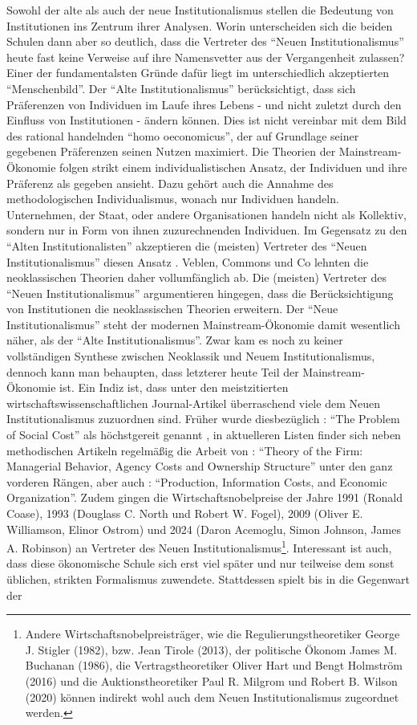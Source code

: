 Sowohl der alte als auch der neue Institutionalismus stellen die Bedeutung von Institutionen ins Zentrum ihrer Analysen. Worin unterscheiden sich die beiden Schulen dann aber so deutlich, dass die Vertreter des "`Neuen Institutionalismus"' heute fast keine Verweise auf ihre Namensvetter aus der Vergangenheit zulassen? Einer der fundamentalsten Gründe dafür liegt im unterschiedlich akzeptierten "`Menschenbild"'. Der "`Alte Institutionalismus"' berücksichtigt, dass sich Präferenzen von Individuen im Laufe ihres Lebens - und nicht zuletzt durch den Einfluss von Institutionen - ändern können. Dies ist nicht vereinbar mit dem Bild des rational handelnden "`homo oeconomicus"', der auf Grundlage seiner gegebenen Präferenzen seinen Nutzen maximiert. Die Theorien der Mainstream-Ökonomie folgen strikt einem individualistischen Ansatz, der Individuen und ihre Präferenz als gegeben ansieht. Dazu gehört auch die Annahme des methodologischen Individualismus, wonach nur Individuen handeln. Unternehmen, der Staat, oder andere Organisationen handeln nicht als Kollektiv, sondern nur in Form von ihnen zuzurechnenden Individuen. Im Gegensatz zu den "`Alten Institutionalisten"' akzeptieren die (meisten) Vertreter des "`Neuen Institutionalismus"' diesen Ansatz \parencite[S. 177]{Hodgson1998}. Veblen, Commons und Co lehnten die neoklassischen Theorien daher vollumfänglich ab. Die (meisten) Vertreter des "`Neuen Institutionalismus"' argumentieren hingegen, dass die Berücksichtigung von Institutionen die neoklassischen Theorien erweitern. Der "`Neue Institutionalismus"' steht der modernen Mainstream-Ökonomie damit wesentlich näher, als der "`Alte Institutionalismus"'. Zwar kam es noch zu keiner vollständigen Synthese zwischen Neoklassik und Neuem Institutionalismus, dennoch kann man behaupten, dass letzterer heute Teil der Mainstream-Ökonomie ist. Ein Indiz ist, dass unter den meistzitierten wirtschaftswissenschaftlichen Journal-Artikel überraschend viele dem Neuen Institutionalismus zuzuordnen sind. Früher wurde diesbezüglich \textcite{Coase1960}: "`The Problem of Social Cost"' als höchstgereit genannt \parencite{Coase1991}, in aktuelleren Listen \parencite{Kim2006, Mergio2016} finder sich neben methodischen Artikeln regelmäßig die Arbeit von \textcite{Jensen1976}: "`Theory of the Firm: Managerial Behavior, Agency Costs and Ownership Structure"' unter den ganz vorderen Rängen, aber auch \textcite{Alchian1972}: "`Production, Information Costs, and Economic Organization"'. Zudem gingen die Wirtschaftsnobelpreise der Jahre 1991 (Ronald Coase), 1993 (Douglass C. North und Robert W. Fogel), 2009 (Oliver E. Williamson, Elinor Ostrom) und 2024 (Daron Acemoglu, Simon Johnson, James A. Robinson) an Vertreter des Neuen Institutionalismus\footnote{Andere Wirtschaftsnobelpreisträger, wie die Regulierungstheoretiker George J. Stigler (1982), bzw. Jean Tirole (2013), der politische Ökonom James M. Buchanan (1986), die Vertragstheoretiker Oliver Hart und Bengt Holmström (2016) und die Auktionstheoretiker Paul R. Milgrom und Robert B. Wilson (2020) können indirekt wohl auch dem Neuen Institutionalismus zugeordnet werden.}. Interessant ist auch, dass diese ökonomische Schule sich erst viel später und nur teilweise dem sonst üblichen, strikten Formalismus zuwendete. Stattdessen spielt bis in die Gegenwart der 